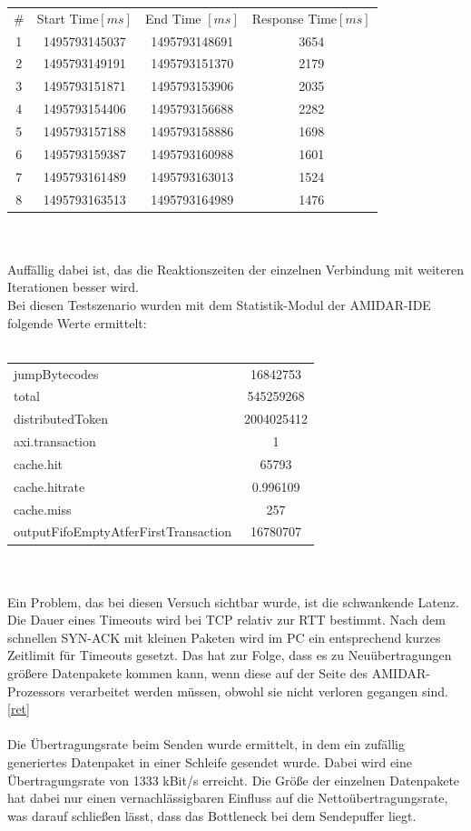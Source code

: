 \begin{tabular}{cccc}
\# & Start Time$[ms]$ & End Time $[ms]$ & Response Time$[ms]$\\
1 &1495793145037&	1495793148691&	3654\\
2 &1495793149191&	1495793151370&	2179\\
3 &1495793151871&	1495793153906&	2035\\
4 &1495793154406&	1495793156688&	2282\\
5 &1495793157188&	1495793158886&	1698\\
6 &1495793159387&	1495793160988&	1601\\
7 &1495793161489&	1495793163013&	1524\\
8 &1495793163513&	1495793164989&	1476\\
\end{tabular}\\\\
Auffällig dabei ist, das die Reaktionszeiten der einzelnen Verbindung mit weiteren Iterationen besser wird. \\
Bei diesen Testszenario wurden mit dem Statistik-Modul der AMIDAR-IDE folgende Werte ermittelt:\\\\
\begin{tabular}{lc}
jumpBytecodes & 16842753\\
total & 545259268 \\
distributedToken & 2004025412 \\
axi.transaction& 1\\
cache.hit & 65793\\
cache.hitrate& 0.996109\\
cache.miss& 257\\
outputFifoEmptyAtferFirstTransaction&16780707
\end{tabular}\\\\
Ein Problem, das bei diesen Versuch sichtbar wurde, ist die schwankende Latenz. Die Dauer eines Timeouts wird bei TCP relativ zur RTT bestimmt. Nach dem schnellen SYN-ACK mit kleinen Paketen wird im PC ein entsprechend kurzes Zeitlimit für Timeouts gesetzt. Das hat zur Folge, dass es zu Neuübertragungen größere Datenpakete kommen kann, wenn diese auf der Seite des AMIDAR-Prozessors verarbeitet werden müssen, obwohl sie nicht verloren gegangen sind.\autoref{ret} \\\\
Die Übertragungsrate beim Senden wurde ermittelt, in dem ein zufällig generiertes Datenpaket in einer Schleife gesendet wurde. Dabei wird eine Übertragungsrate von 1333 kBit/s erreicht. Die Größe der einzelnen Datenpakete hat dabei nur einen vernachlässigbaren Einfluss auf die Nettoübertragungsrate, was darauf schließen lässt, dass das Bottleneck bei dem Sendepuffer liegt. \\\\
